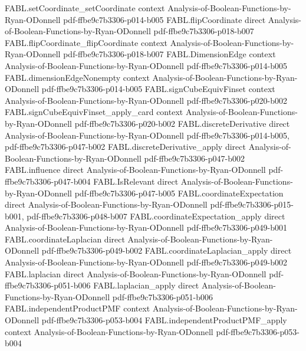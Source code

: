 \begin{theorem}
\proofstep
  {FABL.setCoordinate_setCoordinate}
  {context}
  {Analysis-of-Boolean-Functions-by-Ryan-ODonnell}
  {pdf-ffbe9c7b3306-p014-b005}
\proofstep
  {FABL.flipCoordinate}
  {direct}
  {Analysis-of-Boolean-Functions-by-Ryan-ODonnell}
  {pdf-ffbe9c7b3306-p018-b007}
\proofstep
  {FABL.flipCoordinate_flipCoordinate}
  {context}
  {Analysis-of-Boolean-Functions-by-Ryan-ODonnell}
  {pdf-ffbe9c7b3306-p018-b007}
\proofstep
  {FABL.DimensionEdge}
  {context}
  {Analysis-of-Boolean-Functions-by-Ryan-ODonnell}
  {pdf-ffbe9c7b3306-p014-b005}
\proofstep
  {FABL.dimensionEdgeNonempty}
  {context}
  {Analysis-of-Boolean-Functions-by-Ryan-ODonnell}
  {pdf-ffbe9c7b3306-p014-b005}
\proofstep
  {FABL.signCubeEquivFinset}
  {context}
  {Analysis-of-Boolean-Functions-by-Ryan-ODonnell}
  {pdf-ffbe9c7b3306-p020-b002}
\proofstep
  {FABL.signCubeEquivFinset_apply_card}
  {context}
  {Analysis-of-Boolean-Functions-by-Ryan-ODonnell}
  {pdf-ffbe9c7b3306-p020-b002}
\proofstep
  {FABL.discreteDerivative}
  {direct}
  {Analysis-of-Boolean-Functions-by-Ryan-ODonnell}
  {pdf-ffbe9c7b3306-p014-b005,
    pdf-ffbe9c7b3306-p047-b002}
\proofstep
  {FABL.discreteDerivative_apply}
  {direct}
  {Analysis-of-Boolean-Functions-by-Ryan-ODonnell}
  {pdf-ffbe9c7b3306-p047-b002}
\proofstep
  {FABL.influence}
  {direct}
  {Analysis-of-Boolean-Functions-by-Ryan-ODonnell}
  {pdf-ffbe9c7b3306-p047-b004}
\proofstep
  {FABL.IsRelevant}
  {direct}
  {Analysis-of-Boolean-Functions-by-Ryan-ODonnell}
  {pdf-ffbe9c7b3306-p047-b005}
\proofstep
  {FABL.coordinateExpectation}
  {direct}
  {Analysis-of-Boolean-Functions-by-Ryan-ODonnell}
  {pdf-ffbe9c7b3306-p015-b001,
    pdf-ffbe9c7b3306-p048-b007}
\proofstep
  {FABL.coordinateExpectation_apply}
  {direct}
  {Analysis-of-Boolean-Functions-by-Ryan-ODonnell}
  {pdf-ffbe9c7b3306-p049-b001}
\proofstep
  {FABL.coordinateLaplacian}
  {direct}
  {Analysis-of-Boolean-Functions-by-Ryan-ODonnell}
  {pdf-ffbe9c7b3306-p049-b002}
\proofstep
  {FABL.coordinateLaplacian_apply}
  {direct}
  {Analysis-of-Boolean-Functions-by-Ryan-ODonnell}
  {pdf-ffbe9c7b3306-p049-b002}
\proofstep
  {FABL.laplacian}
  {direct}
  {Analysis-of-Boolean-Functions-by-Ryan-ODonnell}
  {pdf-ffbe9c7b3306-p051-b006}
\proofstep
  {FABL.laplacian_apply}
  {direct}
  {Analysis-of-Boolean-Functions-by-Ryan-ODonnell}
  {pdf-ffbe9c7b3306-p051-b006}
\proofstep
  {FABL.independentProductPMF}
  {context}
  {Analysis-of-Boolean-Functions-by-Ryan-ODonnell}
  {pdf-ffbe9c7b3306-p053-b004}
\proofstep
  {FABL.independentProductPMF_apply}
  {context}
  {Analysis-of-Boolean-Functions-by-Ryan-ODonnell}
  {pdf-ffbe9c7b3306-p053-b004}

\end{theorem}
